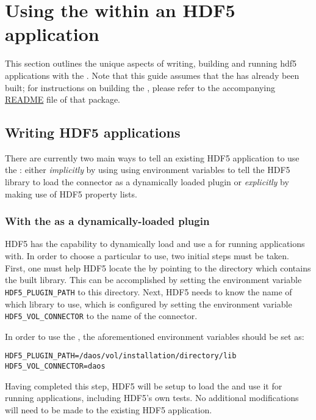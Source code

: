 \documentclass[../users_guide.tex]{subfiles}
\begin{document}
\section{Using the \dvc{} within an HDF5 application}

This section outlines the unique aspects of writing, building and running
\acrshort{hdf5} applications with the \dvc{}. Note that this guide assumes that
the \dvc{} has already
been built; for instructions on building the \dvc{}, please refer to
the accompanying \href{https://bitbucket.hdfgroup.org/projects/HDF5VOL/repos/daos-vol/browse/README.md}{README} file of that package.

\subsection{Writing HDF5 \dvc{} applications}

There are currently two main ways to tell an existing HDF5 application to use
the \dvc{}: either \textit{implicitly} by using using environment
variables to tell the HDF5 library to load the connector as a dynamically loaded
plugin or \textit{explicitly} by making use of HDF5 property lists.

\subsubsection{With the \dvc{} as a dynamically-loaded plugin}

HDF5 has the capability to dynamically load and use a \vc{} for running
applications with. In order to choose a particular \vc{} to use, two
initial steps must be taken. First, one must help HDF5 locate the \vc{}
by pointing to the directory which contains the built library. This can be
accomplished by setting the environment variable \texttt{HDF5\_PLUGIN\_PATH} to
this directory. Next, HDF5 needs to know the name of which library to use, which
is configured by setting the environment variable \texttt{HDF5\_VOL\_CONNECTOR}
to the name of the connector.

In order to use the \dvc{}, the aforementioned environment variables 
should be set as:

\begin{verbatim}
HDF5_PLUGIN_PATH=/daos/vol/installation/directory/lib
HDF5_VOL_CONNECTOR=daos
\end{verbatim}

Having completed this step, HDF5 will be setup to load the \dvc{}
and use it for running applications, including HDF5's own tests.
No additional modifications will need to be made to the existing HDF5 application.
\end{document}
